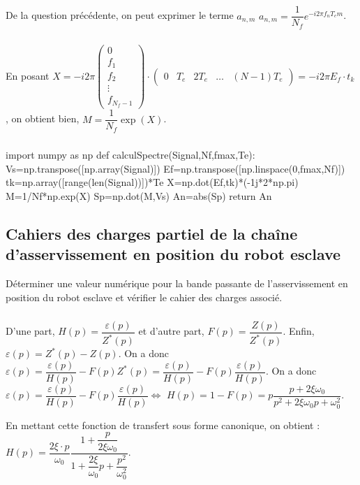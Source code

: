 \documentclass[10pt,fleqn]{article} %
\begin{document}
\subparagraph{} %
De la question précédente, on peut exprimer le terme $a_{n,m}$ 
$a_{n,m}=\dfrac{1}{N_f}e^{-i2\pi f_{n}T_em}$.


\subparagraph{} %

En posant 
$
X=-i2\pi
\left(
\begin{array}{c}
0\\
f_1\\
f_2\\
\vdots\\
f_{N_f-1}
\end{array}
\right)
\cdot
\left(
\begin{array}{ccccc}
0& T_e & 2T_e &\ldots & (N-1)T_e
\end{array}
\right)
=-i2\pi E_f\cdot t_k
$, on obtient bien, $
M=\dfrac{1}{N_f}\exp(X)$.

\subparagraph{} %
\begin{py}
\begin{python}
import numpy as np
def calculSpectre(Signal,Nf,fmax,Te):
    Vs=np.transpose([np.array(Signal)])
    Ef=np.transpose([np.linspace(0,fmax,Nf)])
    tk=np.array([range(len(Signal))])*Te
    X=np.dot(Ef,tk)*(-1j*2*np.pi)
    M=1/Nf*np.exp(X)
    Sp=np.dot(M,Vs)
    An=abs(Sp)
    return An
\end{python}
\end{py}

\subsection{Cahiers des charges partiel de la chaîne d'asservissement en position du robot esclave}

\begin{obj}
Déterminer une valeur numérique pour la bande passante de l’asservissement en position du robot
esclave et vérifier le cahier des charges associé.
\end{obj}

\subparagraph{}	 %

D'une part, $H(p)=\dfrac{\varepsilon (p)}{Z^*(p)}$ et d'autre part, $F(p)=\dfrac{Z (p)}{Z^*(p)}$. Enfin, $\varepsilon(p)=Z^*(p)-Z(p)$. On a donc $\varepsilon(p)=\dfrac{\varepsilon(p)}{H(p)} - F(p)Z^*(p)=\dfrac{\varepsilon(p)}{H(p)} - F(p)\dfrac{\varepsilon(p)}{H(p)}$. On a donc  $\varepsilon(p)=\dfrac{\varepsilon(p)}{H(p)} - F(p)\dfrac{\varepsilon(p)}{H(p)} \Leftrightarrow $ $H(p)=1 - F(p)= p\dfrac{p+2\xi\omega_0  }{p^2+2\xi\omega_0 p + \omega_0^2}$.


En mettant cette fonction de transfert sous forme canonique, on  obtient : 
$
H(p)=\dfrac{2\xi\cdot p}{\omega_0}\dfrac{1+\dfrac{p}{2\xi\omega_0}}{1+\dfrac{2\xi}{\omega_0}p+\dfrac{p^2}{\omega_0^2}}
$.
\end{document}
